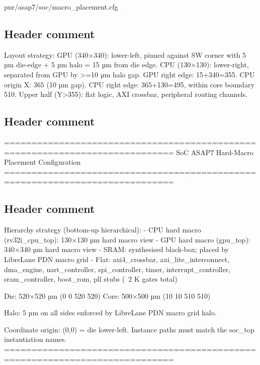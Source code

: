 \begin{relocated}{pnr/asap7/soc/macro_placement.cfg}

\subsection*{Header comment}

\begin{textblock}
Layout strategy:
  GPU (340×340): lower-left, pinned against SW corner with 5 µm die-edge +
                 5 µm halo = 15 µm from die edge.
  CPU (130×130): lower-right, separated from GPU by >=10 µm halo gap.
                 GPU right edge: 15+340=355.  CPU origin X: 365 (10 µm gap).
                 CPU right edge: 365+130=495, within core boundary 510.
  Upper half (Y>355): flat logic, AXI crossbar, peripheral routing channels.

\end{textblock}

\subsection*{Header comment}

\begin{textblock}
=============================================================================
SoC ASAP7 Hard-Macro Placement Configuration
=============================================================================
\end{textblock}

\subsection*{Header comment}

\begin{textblock}
Hierarchy strategy (bottom-up hierarchical):
  - CPU hard macro (rv32i_cpu_top):  130×130 µm hard macro view
  - GPU hard macro (gpu_top):        340×340 µm hard macro view
  - SRAM:  synthesised black-box; placed by LibreLane PDN macro grid
  - Flat:  axi4_crossbar, axi_lite_interconnect, dma_engine, uart_controller,
           spi_controller, timer, interrupt_controller, sram_controller,
           boot_rom, pll stubs  (~2 K gates total)

Die:  520×520 µm   (0 0 520 520)
Core: 500×500 µm   (10 10 510 510)

Halo: 5 µm on all sides enforced by LibreLane PDN macro grid halo.

Coordinate origin: (0,0) = die lower-left.
Instance paths must match the soc_top instantiation names.
=============================================================================
\end{textblock}


\end{relocated}
